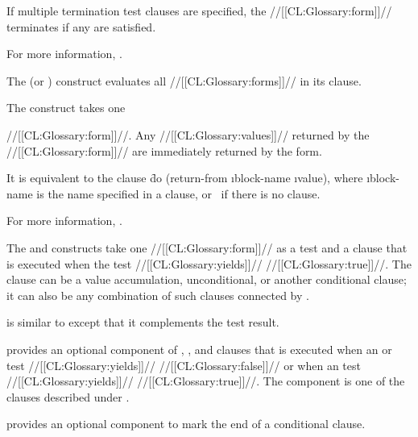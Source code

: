 If multiple termination test clauses are specified, 
the  //[[CL:Glossary:form]]// terminates if any are satisfied.




 
For more information, \seesection\LOOPTermTest.

\endsubsubsubsection%

 
The  (or ) construct evaluates all //[[CL:Glossary:forms]]// in its clause.
 
The  construct takes one 

  //[[CL:Glossary:form]]//. Any //[[CL:Glossary:values]]// returned by the //[[CL:Glossary:form]]// are
  immediately returned by the  form.

   It is equivalent to the clause
   \f{do (return-from \i{block-name} \i{value})},
   where \i{block-name} is the name specified in a 
   clause, or \nil\ if there is no  clause.


For more information, \seesection\LOOPUnconditional.

\endsubsubsubsection%


The  and  constructs take one //[[CL:Glossary:form]]// as a test 
and a clause that is executed when the test //[[CL:Glossary:yields]]// //[[CL:Glossary:true]]//.
The clause can be a value accumulation, unconditional, or 
another conditional clause; it can also be any combination
of such clauses connected by .
 
 is similar to 
except that it complements the test result.

 provides an optional component of ,
, and  clauses that is executed 
     when an  or  test //[[CL:Glossary:yields]]// //[[CL:Glossary:false]]//
  or when an  test //[[CL:Glossary:yields]]// //[[CL:Glossary:true]]//.
The component is one of the clauses described under .

 provides an optional component to mark the
end of a conditional clause.
 

